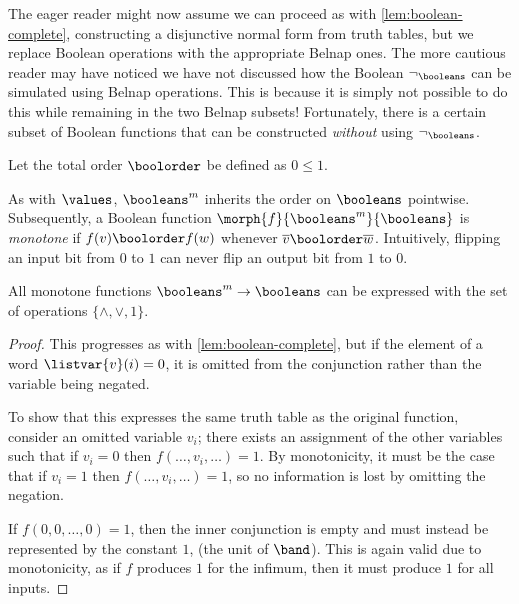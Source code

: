The eager reader might now assume we can proceed as with
\cref{lem:boolean-complete},
constructing a disjunctive normal form from truth tables, but we replace Boolean
operations with the appropriate Belnap ones.
The more cautious reader may have noticed we have not discussed how the
Boolean \(\neg_\booleans\) can be simulated using Belnap operations.
This is because it is simply not possible to do this while remaining in the
two Belnap subsets!
Fortunately, there is a certain subset of Boolean functions that can be
constructed \emph{without} using \(\neg_\booleans\).

\begin{definition}
    Let the total order \(\boolorder\) be defined as \(0 \leq 1\).
\end{definition}

As with \(\values\), \(\booleans^m\) inherits the order on \(\booleans\)
pointwise.
Subsequently, a Boolean function \(\morph{f}{\booleans^m}{\booleans}\) is
\emph{monotone} if \(f(v) \boolorder f(w)\) whenever
\(\overline{v} \boolorder \overline{w}\).
Intuitively, flipping an input bit from \(0\) to \(1\) can never flip an output
bit from \(1\) to \(0\).

\begin{lemma}
    \label{lem:boolean-complete-monotone}
    All monotone functions \(\booleans^m \to \booleans\) can be expressed with
    the set of operations \(\{\land,\lor,1\}\).
\end{lemma}
\begin{proof}
    This progresses as with \cref{lem:boolean-complete}, but if the element of
    a word \(\listvar{v}(i) = 0\), it is omitted from the conjunction
    rather than the variable being negated.

    To show that this expresses the same truth table as the original function,
    consider an omitted variable \(v_i\); there exists an assignment of the
    other variables such that if \(v_i = 0\) then \(f(\dots, v_i, \dots) = 1\).
    By monotonicity, it must be the case that if \(v_i = 1\) then
    \(f(\dots, v_i, \dots) = 1\), so no information is lost by omitting
    the negation.

    If \(f(0, 0, \dots, 0) = 1\), then the inner conjunction is empty and must
    instead be represented by the constant \(1\), (the unit of \(\band\)).
    This is again valid due to monotonicity, as if \(f\) produces \(1\) for the
    infimum, then it must produce \(1\) for all inputs.
\end{proof}

